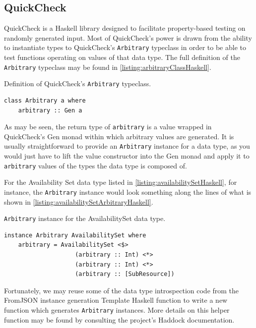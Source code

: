 \documentclass[11pt]{report}
\begin{document}
\subsection{QuickCheck}

QuickCheck is a Haskell library designed to facilitate property-based testing
on randomly generated input. Most of QuickCheck's power is drawn from the
ability to instantiate types to QuickCheck's \texttt{Arbitrary} typeclass in
order to be able to test functions operating on values of that data type.
The full definition of the \texttt{Arbitrary} typeclass may be found in
\autoref{listing:arbitraryClassHaskell}.

\begin{listing}[H]
\caption{Definition of QuickCheck's \texttt{Arbitrary} typeclass.}
\label{listing:arbitraryClassHaskell}
\begin{verbatim}
class Arbitrary a where
    arbitrary :: Gen a
\end{verbatim}
\end{listing}

As may be seen, the return type of \texttt{arbitrary} is a value wrapped in
QuickCheck's Gen monad within which arbitrary values are generated. It is
usually straightforward to provide an \texttt{Arbitrary} instance for a data
type, as you would just have to lift the value constructor into the Gen monad
and apply it to \texttt{arbitrary} values of the types the data type is
composed of.

For the Availability Set data type listed in
\autoref{listing:availabilitySetHaskell}, for instance, the \texttt{Arbitrary}
instance would look something along the lines of what is shown in
\autoref{listing:availabilitySetArbitraryHaskell}.

\begin{listing}[H]
\caption{\texttt{Arbitrary} instance for the AvailabilitySet data type.}
\label{listing:availabilitySetArbitraryHaskell}
\begin{verbatim}
instance Arbitrary AvailabilitySet where
    arbitrary = AvailabilitySet <$>
                    (arbitrary :: Int) <*>
                    (arbitrary :: Int) <*>
                    (arbitrary :: [SubResource])
\end{verbatim}
\end{listing}

Fortunately, we may reuse some of the data type introspection code from the
FromJSON instance generation Template Haskell function to write a new function
which generates \texttt{Arbitrary} instances. More details on this helper
function may be found by consulting the project's Haddock
\cite{haskzureHaddocks} documentation.
\end{document}
